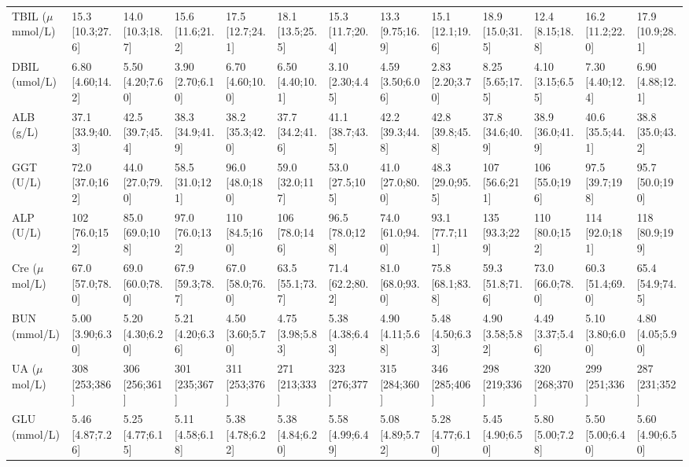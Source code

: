 \documentclass{article}
\begin{document}
\begin{landscape}
\begin{tiny}
\begin{tabularx}{\linewidth}{p{2.0cm}|X|X|X|X|X|X|X|X|X|X|X|X}
\rowcolor{gray!10}
TBIL ($\mu$mmol/L) & 15.3 [10.3;27.6] & 14.0 [10.3;18.7] & 15.6 [11.6;21.2] & 17.5 [12.7;24.1] & 18.1 [13.5;25.5] & 15.3 [11.7;20.4] & 13.3 [9.75;16.9] & 15.1 [12.1;19.6] & 18.9 [15.0;31.5] & 12.4 [8.15;18.8] & 16.2 [11.2;22.0] & 17.9 [10.9;28.1] \\
\rowcolor{gray!10}
DBIL (umol/L) & 6.80 [4.60;14.2] & 5.50 [4.20;7.60] & 3.90 [2.70;6.10] & 6.70 [4.60;10.0] & 6.50 [4.40;10.1] & 3.10 [2.30;4.45] & 4.59 [3.50;6.06] & 2.83 [2.20;3.70] & 8.25 [5.65;17.5] & 4.10 [3.15;6.55] & 7.30 [4.40;12.4] & 6.90 [4.88;12.1] \\
\rowcolor{gray!10}
ALB (g/L) & 37.1 [33.9;40.3] & 42.5 [39.7;45.4] & 38.3 [34.9;41.9] & 38.2 [35.3;42.0] & 37.7 [34.2;41.6] & 41.1 [38.7;43.5] & 42.2 [39.3;44.8] & 42.8 [39.8;45.8] & 37.8 [34.6;40.9] & 38.9 [36.0;41.9] & 40.6 [35.5;44.1] & 38.8 [35.0;43.2] \\
\rowcolor{gray!10}
GGT (U/L) & 72.0 [37.0;162]  & 44.0 [27.0;79.0] & 58.5 [31.0;121]  & 96.0 [48.0;180]  & 59.0 [32.0;117]  & 53.0 [27.5;105]  & 41.0 [27.0;80.0] & 48.3 [29.0;95.5] &  107 [56.6;211]  &  106 [55.0;196]  & 97.5 [39.7;198]  & 95.7 [50.0;190]  \\
\rowcolor{gray!10}
ALP (U/L) &  102 [76.0;152]  & 85.0 [69.0;108]  & 97.0 [76.0;132]  &  110 [84.5;160]  &  106 [78.0;146]  & 96.5 [78.0;128]  & 74.0 [61.0;94.0] & 93.1 [77.7;111]  &  135 [93.3;229]  &  110 [80.0;152]  &  114 [92.0;181]  &  118 [80.9;199]  \\
\rowcolor{gray!10}
Cre ($\mu$mol/L) & 67.0 [57.0;78.0] & 69.0 [60.0;78.0] & 67.9 [59.3;78.7] & 67.0 [58.0;76.0] & 63.5 [55.1;73.7] & 71.4 [62.2;80.2] & 81.0 [68.0;93.0] & 75.8 [68.1;83.8] & 59.3 [51.8;71.6] & 73.0 [66.0;78.0] & 60.3 [51.4;69.0] & 65.4 [54.9;74.5] \\
\rowcolor{gray!10}
BUN (mmol/L) & 5.00 [3.90;6.30] & 5.20 [4.30;6.20] & 5.21 [4.20;6.36] & 4.50 [3.60;5.70] & 4.75 [3.98;5.83] & 5.38 [4.38;6.43] & 4.90 [4.11;5.68] & 5.48 [4.50;6.33] & 4.90 [3.58;5.82] & 4.49 [3.37;5.46] & 5.10 [3.80;6.00] & 4.80 [4.05;5.90] \\
\rowcolor{gray!10}
UA ($\mu$mol/L) &  308 [253;386]   &  306 [256;361]   &  301 [235;367]   &  311 [253;376]   &  271 [213;333]   &  323 [276;377]   &  315 [284;360]   &  346 [285;406]   &  298 [219;336]   &  320 [268;370]   &  299 [251;336]   &  287 [231;352]   \\
\rowcolor{gray!10}
GLU (mmol/L) & 5.46 [4.87;7.26] & 5.25 [4.77;6.15] & 5.11 [4.58;6.18] & 5.38 [4.78;6.22] & 5.38 [4.84;6.20] & 5.58 [4.99;6.49] & 5.08 [4.89;5.72] & 5.28 [4.77;6.10] & 5.45 [4.90;6.50] & 5.80 [5.00;7.28] & 5.50 [5.00;6.40] & 5.60 [4.90;6.50] \\

\end{tabularx}
\end{tiny}
\end{landscape}
\end{document}
